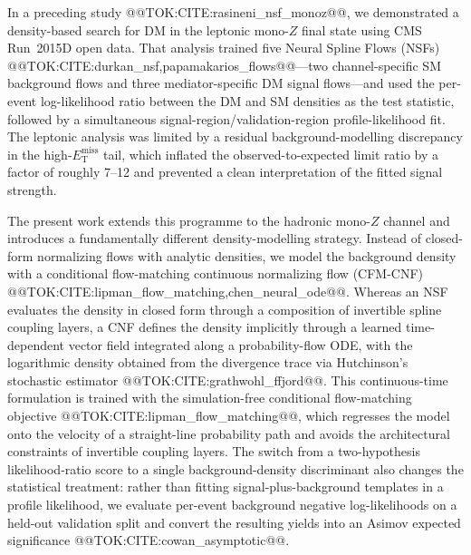 \documentclass[11pt]{article}
\newcommand{\MET}{\ensuremath{E_{\mathrm{T}}^{\mathrm{miss}}}}
\begin{document}
In a preceding study @@TOK:CITE:rasineni_nsf_monoz@@, we demonstrated a
density-based search for DM in the leptonic mono-$Z$ final state using CMS
Run~2015D open data. That analysis trained five Neural Spline Flows
(NSFs) @@TOK:CITE:durkan_nsf,papamakarios_flows@@---two channel-specific SM
background flows and three mediator-specific DM signal flows---and used the
per-event log-likelihood ratio between the DM and SM densities as the test
statistic, followed by a simultaneous signal-region/validation-region
profile-likelihood fit. The leptonic analysis was limited by a residual
background-modelling discrepancy in the high-\MET{} tail, which inflated the
observed-to-expected limit ratio by a factor of roughly 7--12 and prevented a
clean interpretation of the fitted signal strength.

The present work extends this programme to the hadronic mono-$Z$ channel and
introduces a fundamentally different density-modelling strategy. Instead of
closed-form normalizing flows with analytic densities, we model the
background density with a conditional flow-matching continuous normalizing
flow (CFM-CNF) @@TOK:CITE:lipman_flow_matching,chen_neural_ode@@. Whereas an NSF
evaluates the density in closed form through a composition of invertible
spline coupling layers, a CNF defines the density implicitly through a
learned time-dependent vector field integrated along a probability-flow ODE,
with the logarithmic density obtained from the divergence trace via
Hutchinson's stochastic estimator @@TOK:CITE:grathwohl_ffjord@@. This
continuous-time formulation is trained with the simulation-free conditional
flow-matching objective @@TOK:CITE:lipman_flow_matching@@, which regresses the
model onto the velocity of a straight-line probability path and avoids the
architectural constraints of invertible coupling layers. The switch from a
two-hypothesis likelihood-ratio score to a single background-density
discriminant also changes the statistical treatment: rather than fitting
signal-plus-background templates in a profile likelihood, we evaluate
per-event background negative log-likelihoods on a held-out validation split
and convert the resulting yields into an Asimov expected significance
@@TOK:CITE:cowan_asymptotic@@.
\end{document}
